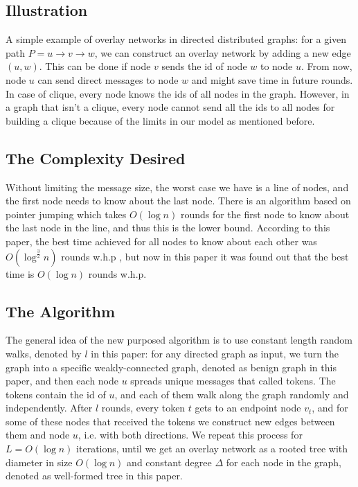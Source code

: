 \documentclass[11pt]{article}
\begin{document}
\subsection{Illustration}
A simple example of overlay networks in directed distributed graphs: for a given path $P=u\rightarrow v \rightarrow w$, we can construct an overlay network by adding a new edge $(u,w)$. This can be done if node $v$ sends the id of node $w$ to node $u$. From now, node $u$ can send direct messages to node $w$ and might save time in future rounds. In case of clique, every node knows the ids of all nodes in the graph. However, in a graph that isn't a clique, every node cannot send all the ids to all nodes for building a clique because of the limits in our model as mentioned before.

\subsection{The Complexity Desired}
Without limiting the message size, the worst case we have is a line of nodes, and the first node needs to know about the last node. There is an algorithm based on pointer jumping which takes $O(\log{n})$ rounds for the first node to know about the last node in the line, and thus this is the lower bound. According to this paper, the best time achieved for all nodes to know about each other was $O(\log^{\frac{3}{2}}n)$ rounds w.h.p \cite{ref1}, but now in this paper it was found out that the best time is $O(\log{n})$ rounds w.h.p.

\subsection{The Algorithm}
The general idea of the new purposed algorithm is to use constant length random walks, denoted by $l$ in this paper: for any directed graph as input, we turn the graph into a specific weakly-connected graph, denoted as benign graph in this paper, and then each node $u$ spreads unique messages that called tokens. The tokens contain the id of $u$, and each of them walk along the graph randomly and independently. After $l$ rounds, every token $t$ gets to an endpoint node $v_{t}$, and for some of these nodes that received the tokens we construct new edges between them and node $u$, i.e. with both directions. We repeat this process for $L=O(\log{n})$ iterations, until we get an overlay network as a rooted tree with diameter in size $O(\log{n})$ and constant degree $\Delta$ for each node in the graph, denoted as well-formed tree in this paper.
\end{document}
